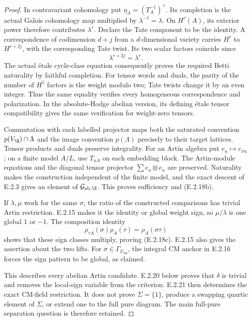 \begin{proof}
In contravariant cohomology put
\(\eta_A=(T_A^{-1})^\vee\). Its completion is the actual
Galois cohomology map multiplied by
\(\lambda^{-1}=\lambda\). On \(H^r(A)\), its exterior power
therefore contributes \(\lambda^r\).
Declare the Tate component to be the identity.
A correspondence of codimension \(d+j\) from a
\(d\)-dimensional variety carries \(H^r\) to \(H^{r+2j}\),
with the corresponding Tate twist. Its two scalar factors
coincide since
\[
 \lambda^{r+2j}=\lambda^r.
\]
The actual étale cycle-class equation consequently proves
the required Betti naturality by faithful completion.
For tensor words and duals, the parity of the number of
\(H^1\) factors is the weight modulo two; Tate twists change
it by an even integer. Thus the same equality verifies
every homogeneous correspondence and polarization.
In the absolute-Hodge abelian version, its defining étale
tensor compatibility gives the same verification for
weight-zero tensors.

Commutation with each labelled projector maps both the
saturated convention \(p(V_\Q)\cap\Lambda\) and the image
convention \(p(\Lambda)\) precisely to their target lattices.
Tensor products and duals preserve integrality.
For an Artin algebra put \(e_u\mapsto e_{\sigma u}\);
on a finite model \(A/L\), use \(T_{uA}\) on each
embedding block. The Artin-module equations and the
diagonal tensor projector \(\sum e_u\otimes e_u\)
are preserved. Naturality makes the construction
independent of the finite model, and the exact descent
of E.2.3 gives an element of
\(\mathcal G_{\mathrm{ab},\Z}\).
This proves sufficiency and (E.2.18b).

If \(\lambda,\mu\) work for the same \(\sigma\), the ratio
of the constructed comparisons has trivial Artin
restriction. E.2.15 makes it the identity or global
weight sign, so \(\mu/\lambda\) is one global \(1\)
or \(-1\). The composition identity
\[
 \rho_{\tau A}(\sigma)\rho_A(\tau)=\rho_A(\sigma\tau)
\]
shows that these sign classes multiply, proving
(E.2.18c). E.2.15 also gives the assertion about the
two lifts. For \(\sigma\in\Gamma_{F_{\mathrm{cm}}}\),
the integral CM anchor in E.2.16 forces the sign
pattern to be global, as claimed.

This describes every abelian Artin candidate.
E.2.20 below proves that \(\delta\) is trivial and
removes the local-sign variable from the criterion.
E.2.21 then determines the exact CM-field restriction.
It does not prove \(\Sigma=\{1\}\), produce a swapping
quartic element of \(\Sigma\), or extend one to the
full pure diagram. The main full-pure separation
question is therefore retained.
\end{proof}

